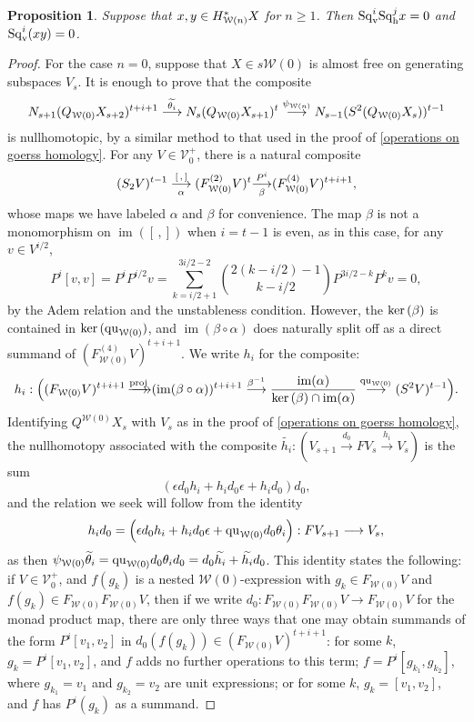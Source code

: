 \documentclass[11pt]{amsart}
\theoremstyle{plain}
\newtheorem{prop}[thm]{Proposition}
\theoremstyle{definition}
\renewcommand{\ker}{\textup{ker}\,}
\DeclareMathOperator{\im}{im}
\renewcommand{\to}{\longrightarrow}
\newcommand{\calW}{\mathcal{W}}
\newcommand{\calV}{\mathcal{V}}
\newcommand{\calw}{\mathcal{W}}
\theoremstyle{plain}
\newcommand{\vect}[2]{\calV^{#1}_{#2}}
\newcommand{\quadratic}{\textup{qu}}
\newcommand{\epi}{{\,\makebox[0cm][l]{\ensuremath\to}\to}}
\newcommand{\mono}{{\to}}
\newcommand{\Sqh}{\mathrm{Sq}_\textup{h}}
\newcommand{\Sqv}{\mathrm{Sq}_\textup{v}}
\newcommand{\deltav}{\delta^\textup{v}}
\begin{document}
\begin{Cohomology operations for all unstable Lie algebras}
\begin{prop}
Suppose that $x,y\in H^*_{\smash{\calW(n)}}X$ for $n\geq1$. Then $\Sqv^{i}\Sqh^{j}x=0$ and $\Sqv^i(xy)=0$.
\end{prop}
\begin{proof}
For the case $n=0$, suppose that $X\in s\calw(0)$ is almost free on generating subspaces $V_s$. It is enough to prove that the composite
\[N_{s+1}(Q_{\calW(0)}X_{s+2})^{t+i+1}
\overset{\smash{\widetilde{\theta_i}}}{\to}
N_s(Q_{\calW(0)}X_{s+1})^{t}
\overset{{\psi_{\calw(n)}}}{\to}
N_{s-1}(S^2(Q_{\calW(0)}X_{s}))^{t-1}
\]
is nullhomotopic, by a similar method to that used in the proof of \ref{operations on goerss homology}. For any $V\in \vect{+}{0}$, there is a natural composite
\[(S_2V)^{t-1}\underset{\smash{\alpha}}{\overset{[\,,\,]}{\to}} (F^{(2)}_{\calW(0)}V)^{t}\underset{\smash{\beta}}{\overset{P^i}{\mono}} (F^{(4)}_{\calW(0)}V)^{t+i+1},\]
whose maps we have labeled $\alpha$ and $\beta$ for convenience.
The map $\beta$ is not a monomorphism on $\im([\,,])$ when $i=t-1$ is even, as in this case, for any $v\in V^{i/2}$,
\[P^i[v,v]=P^{i}P^{i/2}v=\textstyle\sum_{k=i/2+1}^{3i/2-2}{2(k-i/2)-1\choose k-i/2}P^{3i/2-k}P^kv=0,\]
by the Adem relation and the unstableness condition. However, the $\ker(\beta)$ is contained in $\ker(\quadratic_{\calw(0)})$, 
and $\im(\beta\circ\alpha)$ does naturally split off as a direct summand of $(F^{(4)}_{\calW(0)}V)^{t+i+1}$.
 We write $h_i$ for the composite:
\[h_{i}:\Bigl((F_{\calW(0)}V)^{t+i+1}\overset{\textup{proj}}{\epi}
(\im(\beta\circ\alpha))^{t+i+1}\overset{\beta^{-1}}{\to}\frac{\im(\alpha)}{\ker(\beta)\cap\im(\alpha)}\overset{\quadratic_{\calw(0)}}{\to}(S^2V)^{t-1}\Bigr).\]
Identifying $Q^{\calW(0)}X_s$ with $V_s$ as in the proof of \ref{operations on goerss homology}, the nullhomotopy associated with the composite $\widetilde{h_i}:(V_{s+1}\overset{d_0}{\to}FV_s\overset{h_i}{\to}V_s)$ is the sum
\[(\epsilon d_0h_i+h_id_0\epsilon+h_id_0)d_0,\]
and the relation we seek will follow from the identity
\[h_id_0=\Bigl(\epsilon d_0h_i+h_id_0\epsilon+\quadratic_{\calw(0)} d_0\theta_i\Bigr):FV_{s+1}\to V_s,\]
as then $\psi_{\calw(0)}\smash{\widetilde{\theta}_i}=\quadratic_{\calw(0)} d_0\theta_id_0=d_0\widetilde{h_i}+\widetilde{h_i}d_0$. This identity states the following: if $V\in\vect{+}{0}$, and $f(g_k)$ is a nested $\calw(0)$-expression with $g_k\in F_{\calw(0)}V$ and $f(g_k)\in F_{\calw(0)}F_{\calw(0)}V$, then if we write $d_0:F_{\calw(0)}F_{\calw(0)}V\to F_{\calw(0)}V$ for the monad product map, there are only three ways that one may obtain summands of the form $P^i[v_1,v_2]$ in $d_0(f(g_k))\in (F_{\calw(0)}V)^{t+i+1}$: for some $k$, $g_k=P^i[v_1,v_2]$, and $f $ adds no further operations to this term; $f=P^i[g_{k_1},g_{k_2}]$, where $g_{k_1}=v_1$ and $g_{k_2}=v_2$ are unit expressions; or for some $k$, $g_k=[v_1,v_2]$, and  $f$ has $P^i(g_k)$ as a summand.


\end{proof}
\end{Cohomology operations for all unstable Lie algebras}
\end{document}
